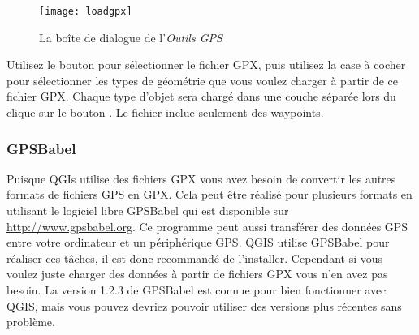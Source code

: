 \begin{figure}[ht]
   \begin{center}
\caption{\label{gpxloader}La boîte de dialogue de l'\emph{Outils GPS} \nixcaption}
\texttt{[image: loadgpx]}
\end{center}
\end{figure}

Utilisez le bouton \browsebutton pour sélectionner le fichier GPX, puis utilisez la case à cocher pour sélectionner les types de géométrie que vous
voulez charger à partir de ce fichier GPX. Chaque type d'objet sera chargé dans une couche séparée lors du clique sur le bouton . Le fichier 
 inclue seulement des waypoints.

\subsubsection{GPSBabel}

Puisque QGIs utilise des fichiers GPX vous avez besoin de convertir les autres formats de fichiers GPS en GPX. Cela peut être réalisé pour plusieurs formats en utilisant le logiciel libre GPSBabel qui est disponible sur \url{http://www.gpsbabel.org}.
Ce programme peut aussi transférer des données GPS entre votre ordinateur et un périphérique GPS. QGIS utilise GPSBabel pour réaliser ces tâches, il est donc recommandé de l'installer. Cependant si vous voulez juste charger des données à partir de fichiers GPX vous n'en avez pas besoin. La version 1.2.3 de GPSBabel est connue pour bien fonctionner avec QGIS, mais vous pouvez devriez pouvoir utiliser des versions plus récentes sans problème.

